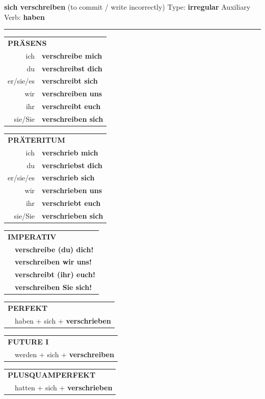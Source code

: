 \documentclass[10pt,a4paper]{revtex4-2}
\begin{document}
\begin{verbbox}
{\Large \bf sich verschreiben} (to commit / write incorrectly) \hfill Type: \textbf{irregular} \hfill Auxiliary Verb: \textbf{haben}

\vspace{5pt}
\hrule
\vspace{5pt}

\begin{tabular}{rl}
\multicolumn{2}{l}{\textbf{PRÄSENS}}\\
ich & \textbf{verschreibe mich}\\
du & \textbf{verschreibst dich}\\
er/sie/es & \textbf{verschreibt sich}\\
wir & \textbf{verschreiben uns}\\
ihr & \textbf{verschreibt euch}\\
sie/Sie & \textbf{verschreiben sich}\\
\end{tabular}
\hfill
\begin{tabular}{rl}
\multicolumn{2}{l}{\textbf{PRÄTERITUM}}\\
ich & \textbf{verschrieb mich}\\
du & \textbf{verschriebst dich}\\
er/sie/es & \textbf{verschrieb sich}\\
wir & \textbf{verschrieben uns}\\
ihr & \textbf{verschriebt euch}\\
sie/Sie & \textbf{verschrieben sich}\\
\end{tabular}
\hfill
\begin{tabular}{rl}
\multicolumn{2}{l}{\textbf{IMPERATIV}}\\
& \textbf{verschreibe (du) dich!}\\
& \textbf{verschreiben wir uns!}\\
& \textbf{verschreibt (ihr) euch!}\\
& \textbf{verschreiben Sie sich!}\\
\end{tabular}

\vspace{10pt}

\begin{tabular}{rl}
\multicolumn{2}{l}{\textbf{PERFEKT}}\\
&haben + sich + \textbf{verschrieben}\\
\end{tabular}
\hfill
\begin{tabular}{rl}
\multicolumn{2}{l}{\textbf{FUTURE I}}\\
& werden + sich + \textbf{verschreiben}\\
\end{tabular}
\hfill
\begin{tabular}{rl}
\multicolumn{2}{l}{\textbf{PLUSQUAMPERFEKT}}\\
& hatten + sich + \textbf{verschrieben}\\
\end{tabular}


\end{verbbox}
\end{document}

